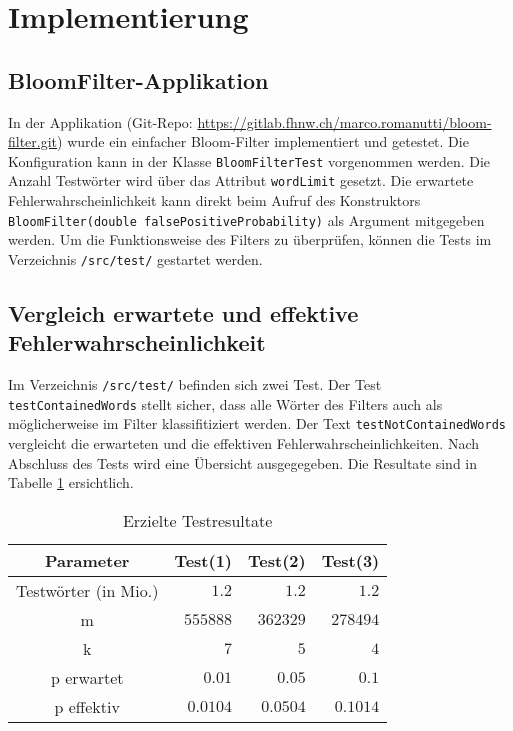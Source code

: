 \documentclass[10pt, a4paper, twocolumn]{article} %
\begin{document}
\section{Implementierung}
\subsection{BloomFilter-Applikation}

In der Applikation (Git-Repo: \url{https://gitlab.fhnw.ch/marco.romanutti/bloom-filter.git}) wurde ein einfacher Bloom-Filter implementiert und getestet.
Die Konfiguration kann in der Klasse \texttt{BloomFilterTest} vorgenommen werden. Die Anzahl Testwörter wird über das Attribut \texttt{wordLimit} gesetzt. Die erwartete Fehlerwahrscheinlichkeit kann direkt beim Aufruf des Konstruktors \texttt{BloomFilter(double falsePositiveProbability)} als Argument mitgegeben werden.
Um die Funktionsweise des Filters zu überprüfen, können die Tests im Verzeichnis \texttt{/src/test/} gestartet werden.

\subsection{Vergleich erwartete und effektive Fehlerwahrscheinlichkeit}

Im Verzeichnis \texttt{/src/test/} befinden sich zwei Test.
Der Test \texttt{testContainedWords} stellt sicher, dass alle Wörter des Filters auch als möglicherweise im Filter klassifitiziert werden.
Der Text \texttt{testNotContainedWords} vergleicht die erwarteten und die effektiven Fehlerwahrscheinlichkeiten.
Nach Abschluss des Tests wird eine Übersicht ausgegegeben.
Die Resultate sind in Tabelle \ref{tests} ersichtlich.

\begin{table}[h]
	\caption{Erzielte Testresultate}
	\label{tests}
	\centering
	\begin{tabular}{crrr}
		\toprule
		\cmidrule(r){1-2}
		Parameter & Test(1) & Test(2) & Test(3) \\
		\midrule
		Testwörter (in Mio.) & $1.2$ & $1.2$ & $1.2$ \\
		m & $555888$ & $362329$ & $278494$ \\
		k & $7$ & $5$ & $4$ \\
		p erwartet & $0.01$ & $0.05$ & $0.1$ \\
		p effektiv & $0.0104$ & $0.0504$ & $0.1014$ \\
		\bottomrule
	\end{tabular}
\end{table}
\end{document}
